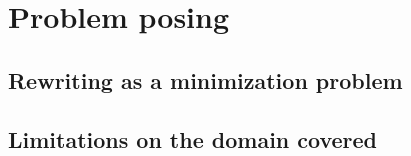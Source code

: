 \chapter{Problem posing}
\section{Rewriting as a minimization problem}
\section{Limitations on the domain covered}